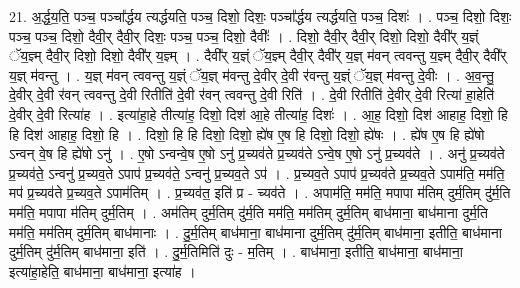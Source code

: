 \documentclass[17pt]{extarticle}
\begin{document}
21. अ॒र्द्ध॒य॒ति॒ पञ्च॒ पञ्चा᳚र्द्धय त्यर्द्धयति॒ पञ्च॒ दिशो॒ दिशः॒ पञ्चा᳚र्द्धय त्यर्द्धयति॒ पञ्च॒ दिशः॑ । . पञ्च॒ दिशो॒ दिशः॒ पञ्च॒ पञ्च॒ दिशो॒ दैवी॒र् दैवी॒र् दिशः॒ पञ्च॒ पञ्च॒ दिशो॒ दैवीः᳚ । . दिशो॒ दैवी॒र् दैवी॒र् दिशो॒ दिशो॒ दैवी᳚र् य॒ज्ञ्ं ॅय॒ज्ञ्म् दैवी॒र् दिशो॒ दिशो॒ दैवी᳚र् य॒ज्ञ्म् । . दैवी᳚र् य॒ज्ञ्ं ॅय॒ज्ञ्म् दैवी॒र् दैवी᳚र् य॒ज्ञ् म॑वन् त्ववन्तु य॒ज्ञ्म् दैवी॒र् दैवी᳚र् य॒ज्ञ् म॑वन्तु । . य॒ज्ञ् म॑वन् त्ववन्तु य॒ज्ञ्ं ॅय॒ज्ञ् म॑वन्तु दे॒वीर् दे॒वी र॑वन्तु य॒ज्ञ्ं ॅय॒ज्ञ् म॑वन्तु दे॒वीः । . अ॒व॒न्तु॒ दे॒वीर् दे॒वी र॑वन् त्ववन्तु दे॒वी रितीति॑ दे॒वी र॑वन् त्ववन्तु दे॒वी रिति॑ । . दे॒वी रितीति॑ दे॒वीर् दे॒वी रित्या॑ हा॒हेति॑ दे॒वीर् दे॒वी रित्या॑ह । . इत्या॑हा॒हे तीत्या॑ह॒ दिशो॒ दिश॑ आ॒हे तीत्या॑ह॒ दिशः॑ । . आ॒ह॒ दिशो॒ दिश॑ आहाह॒ दिशो॒ हि हि दिश॑ आहाह॒ दिशो॒ हि । . दिशो॒ हि हि दिशो॒ दिशो॒ ह्ये॑ष ए॒ष हि दिशो॒ दिशो॒ ह्ये॑षः । . ह्ये॑ष ए॒ष हि ह्ये॑षो ऽन्वन् वे॒ष हि ह्ये॑षो ऽनु॑ । . ए॒षो ऽन्वन्वे॒ष ए॒षो ऽनु॑ प्र॒च्यव॑ते प्र॒च्यव॑ते ऽन्वे॒ष ए॒षो ऽनु॑ प्र॒च्यव॑ते । . अनु॑ प्र॒च्यव॑ते प्र॒च्यव॑ते॒ ऽन्वनु॑ प्र॒च्यव॒ते ऽपाप॑ प्र॒च्यव॑ते॒ ऽन्वनु॑ प्र॒च्यव॒ते ऽप॑ । . प्र॒च्यव॒ते ऽपाप॑ प्र॒च्यव॑ते प्र॒च्यव॒ते ऽपाम॑ति॒ मम॑ति॒ मप॑ प्र॒च्यव॑ते प्र॒च्यव॒ते ऽपाम॑तिम् । . प्र॒च्यव॑त॒ इति॑ प्र - च्यव॑ते । . अपाम॑ति॒ मम॑ति॒ मपापा म॑तिम् दुर्म॒तिम् दु॑र्म॒ति मम॑ति॒ मपापा म॑तिम् दुर्म॒तिम् । . अम॑तिम् दुर्म॒तिम् दु॑र्म॒ति मम॑ति॒ मम॑तिम् दुर्म॒तिम् बाध॑माना॒ बाध॑माना दुर्म॒ति मम॑ति॒ मम॑तिम् दुर्म॒तिम् बाध॑मानाः । . दु॒र्म॒तिम् बाध॑माना॒ बाध॑माना दुर्म॒तिम् दु॑र्म॒तिम् बाध॑माना॒ इतीति॒ बाध॑माना दुर्म॒तिम् दु॑र्म॒तिम् बाध॑माना॒ इति॑ । . दु॒र्म॒तिमिति॑ दुः - म॒तिम् । . बाध॑माना॒ इतीति॒ बाध॑माना॒ बाध॑माना॒ इत्या॑हा॒हेति॒ बाध॑माना॒ बाध॑माना॒ इत्या॑ह । \newline
\end{document}
